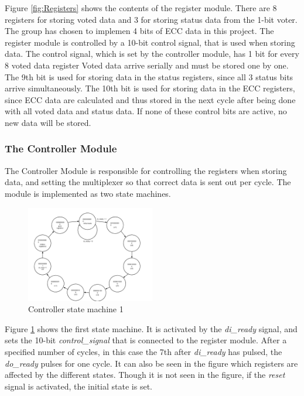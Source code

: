 \documentclass[a4paper]{IEEEtran}
\begin{document}
Figure \ref{fig:Registers} shows the contents of the register module.
There are 8 registers for storing voted data and 3 for storing status data from the 1-bit voter.
The group has chosen to implemen 4 bits of ECC data in this project.
The register module is controlled by a 10-bit control signal, that is used when storing data.
The control signal, which is set by the controller module, has 1 bit for every 8 voted data register Voted data arrive serially and must be stored one by one.
The 9th bit is used for storing data in the status registers, since all 3 status bits arrive simultaneously.
The 10th bit is used for storing data in the ECC registers, since ECC data are calculated and thus stored in the next cycle after being done with all voted data and status data.
If none of these control bits are active, no new data will be stored.

\subsubsection{The Controller Module}
The Controller Module is responsible for controlling the registers when storing data, and setting the multiplexer so that correct data is sent out per cycle.
The module is implemented as two state machines.

\begin{figure}[h!]
    \centering
    \includegraphics[width=0.50\textwidth]{Figures/Solution/ControllerStateMachine1}
    \caption{Controller state machine 1}
    \label{fig:ControllerStateMachine1}
\end{figure}

Figure \ref{fig:ControllerStateMachine1} shows the first state machine.
It is activated by the \textit{di\_ready} signal, and sets the 10-bit \textit{control\_signal} that is connected to the register module.
After a specified number of cycles, in this case the 7th after \textit{di\_ready} has pulsed, the \textit{do\_ready} pulses for one cycle.
It can also be seen in the figure which registers are affected by the different states.
Though it is not seen in the figure, if the \textit{reset} signal is activated, the initial state is set.
\end{document}
